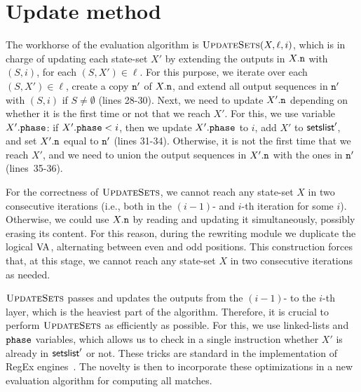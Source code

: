 \section{Update method} 
The workhorse of the evaluation algorithm is $\textproc{UpdateSets}(X, \ell,i)$, which is in charge of updating each state-set $X'$ by extending the outputs in $X.\mathtt{n}$ with $(S,i)$, for each $(S, X') \in \!\ell$. For this purpose, we iterate over each $(S, X') \in \ell$, create a copy $\mathtt{n}'$ of $X.\mathtt{n}$, and extend all output sequences in $\mathtt{n}'$ with $(S,i)$ if $S\neq \emptyset$ (lines 28-30). Next, we need to update $X'.\mathtt{n}$ depending on whether it is the first time or not that we reach $X'$. For this, we use variable $X'.\texttt{phase}$: if $X'.\texttt{phase} < i$, then we update $X'.\texttt{phase}$ to $i$, add $X'$ to $\textsf{setslist}'$, and set $X'.\mathtt{n}$ equal to $\mathtt{n}'$ (lines 31-34). Otherwise, it is not the first time that we reach $X'$, and we need to union the output sequences in $X'.\mathtt{n}$ with the ones in $\mathtt{n}'$ (lines~35-36).

For the correctness of $\textproc{UpdateSets}$, we cannot reach any state-set $X$ in two consecutive iterations (i.e., both in the $(i-1)$- and $i$-th iteration for some $i$). Otherwise, we could use $X.\mathtt{n}$ by reading and updating it simultaneously, possibly erasing its content. For this reason, during the rewriting module we duplicate the logical $\mathrm{VA}$, alternating between even and odd positions. This construction forces that, at this stage, we cannot reach any state-set $X$ in two consecutive iterations as needed.

$\textproc{UpdateSets}$ passes and updates the outputs from the $(i-1)$- to the $i$-th layer, which is the heaviest part of the algorithm. Therefore, it is crucial to perform $\textproc{UpdateSets}$ as efficiently as possible. For this, we use linked-lists and $\texttt{phase}$ variables, which allows us to check in a single instruction whether $X'$ is already in $\textsf{setslist}'$ or not. These tricks are standard in the implementation of RegEx engines~\cite{cox2007regular}. The novelty is then to incorporate these optimizations in a new evaluation algorithm for computing all matches.

